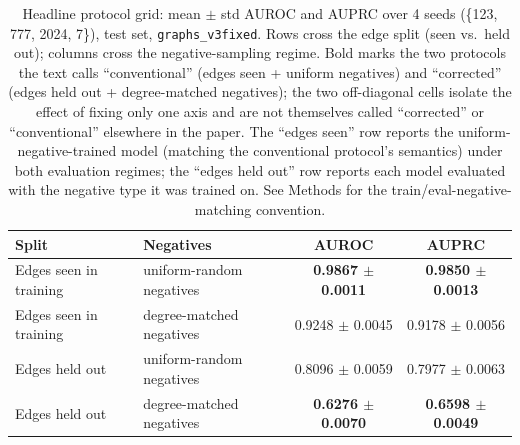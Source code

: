 \begin{table}[h!]
\caption{Headline protocol grid: mean $\pm$ std AUROC and AUPRC over 4 seeds (\{123, 777, 2024, 7\}), test set, \texttt{graphs\_v3fixed}. Rows cross the edge split (seen vs.\ held out); columns cross the negative-sampling regime. Bold marks the two protocols the text calls ``conventional'' (edges seen + uniform negatives) and ``corrected'' (edges held out + degree-matched negatives); the two off-diagonal cells isolate the effect of fixing only one axis and are not themselves called ``corrected'' or ``conventional'' elsewhere in the paper. The ``edges seen'' row reports the uniform-negative-trained model (matching the conventional protocol's semantics) under both evaluation regimes; the ``edges held out'' row reports each model evaluated with the negative type it was trained on. See Methods for the train/eval-negative-matching convention.}
\label{tab:headline_grid}
\small
\begin{tabular}{llcc}
\hline
Split & Negatives & AUROC & AUPRC \\
\hline
Edges seen in training & uniform-random negatives & \textbf{0.9867 $\pm$ 0.0011} & \textbf{0.9850 $\pm$ 0.0013} \\
Edges seen in training & degree-matched negatives & 0.9248 $\pm$ 0.0045 & 0.9178 $\pm$ 0.0056 \\
Edges held out & uniform-random negatives & 0.8096 $\pm$ 0.0059 & 0.7977 $\pm$ 0.0063 \\
Edges held out & degree-matched negatives & \textbf{0.6276 $\pm$ 0.0070} & \textbf{0.6598 $\pm$ 0.0049} \\
\hline
\end{tabular}
\end{table}
